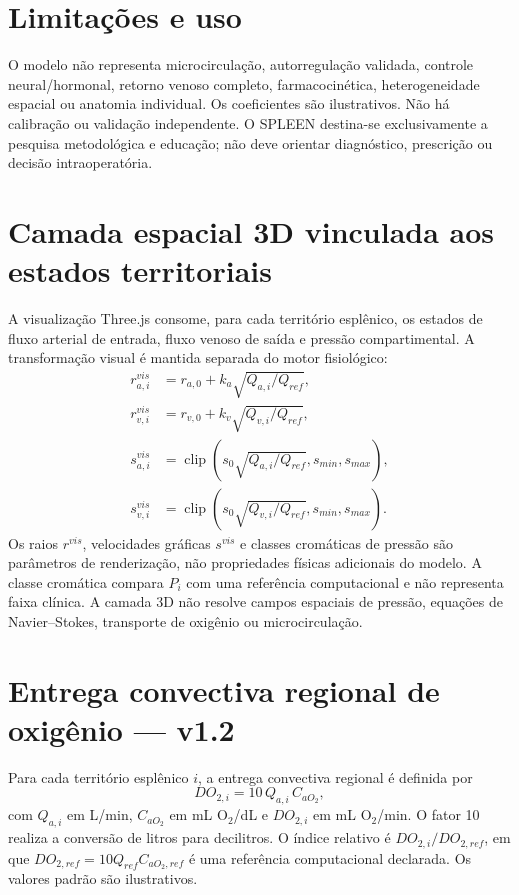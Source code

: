 \documentclass[11pt,a4paper]{article}
\begin{document}
\section{Limitações e uso}
O modelo não representa microcirculação, autorregulação validada, controle neural/hormonal, retorno venoso completo, farmacocinética, heterogeneidade espacial ou anatomia individual. Os coeficientes são ilustrativos. Não há calibração ou validação independente. O SPLEEN destina-se exclusivamente a pesquisa metodológica e educação; não deve orientar diagnóstico, prescrição ou decisão intraoperatória.


\section{Camada espacial 3D vinculada aos estados territoriais}
A visualização Three.js consome, para cada território esplênico, os estados de fluxo arterial de entrada, fluxo venoso de saída e pressão compartimental. A transformação visual é mantida separada do motor fisiológico:
\begin{align}
r_{a,i}^{vis} &= r_{a,0}+k_a\sqrt{Q_{a,i}/Q_{ref}},\\
r_{v,i}^{vis} &= r_{v,0}+k_v\sqrt{Q_{v,i}/Q_{ref}},\\
s_{a,i}^{vis} &= \operatorname{clip}\left(s_0\sqrt{Q_{a,i}/Q_{ref}},s_{min},s_{max}\right),\\
s_{v,i}^{vis} &= \operatorname{clip}\left(s_0\sqrt{Q_{v,i}/Q_{ref}},s_{min},s_{max}\right).
\end{align}
Os raios $r^{vis}$, velocidades gráficas $s^{vis}$ e classes cromáticas de pressão são parâmetros de renderização, não propriedades físicas adicionais do modelo. A classe cromática compara $P_i$ com uma referência computacional e não representa faixa clínica. A camada 3D não resolve campos espaciais de pressão, equações de Navier--Stokes, transporte de oxigênio ou microcirculação.


\section{Entrega convectiva regional de oxigênio — v1.2}
Para cada território esplênico $i$, a entrega convectiva regional é definida por
\[
DO_{2,i}=10\,Q_{a,i}\,C_{aO_2},
\]
com $Q_{a,i}$ em L/min, $C_{aO_2}$ em mL O$_2$/dL e $DO_{2,i}$ em mL O$_2$/min. O fator 10 realiza a conversão de litros para decilitros. O índice relativo é $DO_{2,i}/DO_{2,ref}$, em que $DO_{2,ref}=10 Q_{ref} C_{aO_2,ref}$ é uma referência computacional declarada. Os valores padrão são ilustrativos.
\end{document}
